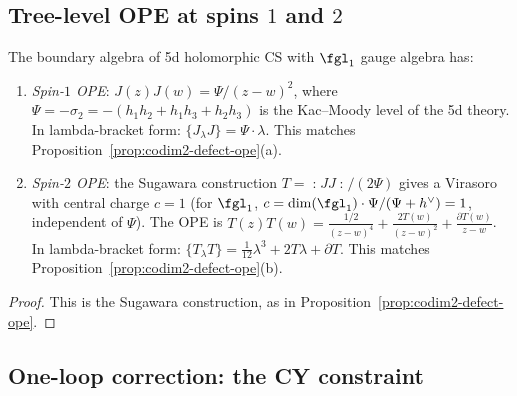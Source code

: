 \subsection{Tree-level OPE at spins \texorpdfstring{$1$}{1} and \texorpdfstring{$2$}{2}}
\label{subsec:tree-level-spin12}

\begin{proposition}
\label{prop:5d-spin12-ope}
The boundary algebra of 5d holomorphic CS with $\fgl_1$ gauge algebra has:
\begin{enumerate}[label=\textup{(\roman*)}]
 \item \emph{Spin-$1$ OPE}: $J(z) J(w) = \Psi/(z-w)^2$, where $\Psi = -\sigma_2 = -(h_1 h_2 + h_1 h_3 + h_2 h_3)$ is the Kac--Moody level of the 5d theory. In lambda-bracket form: $\{J_\lambda J\} = \Psi \cdot \lambda$. This matches Proposition~\ref{prop:codim2-defect-ope}(a).
 \item \emph{Spin-$2$ OPE}: the Sugawara construction $T = \mathopen{:}JJ\mathclose{:}/(2\Psi)$ gives a Virasoro with central charge $c = 1$ (for $\fgl_1$, $c = \dim(\fgl_1) \cdot \Psi/(\Psi + h^\vee) = 1$, independent of $\Psi$). The OPE is $T(z)T(w) = \frac{1/2}{(z-w)^4} + \frac{2T(w)}{(z-w)^2} + \frac{\partial T(w)}{z-w}$. In lambda-bracket form: $\{T_\lambda T\} = \frac{1}{12}\lambda^3 + 2T\lambda + \partial T$. This matches Proposition~\ref{prop:codim2-defect-ope}(b).
\end{enumerate}
\end{proposition}

\begin{proof}
This is the Sugawara construction, as in
Proposition~\ref{prop:codim2-defect-ope}.
\end{proof}

\subsection{One-loop correction: the CY constraint}
\label{subsec:one-loop-cy}

